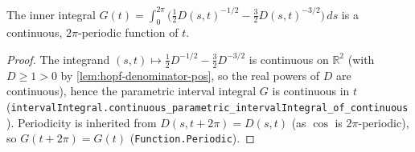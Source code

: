 \begin{lemma}
    \label{lem:hopf-inner-integral-regularity}
    \leanok
    The inner integral
    $G(t)=\int_0^{2\pi}\bigl(\tfrac12 D(s,t)^{-1/2}-\tfrac32 D(s,t)^{-3/2}\bigr)\,ds$
    is a continuous, $2\pi$-periodic function of $t$.
\end{lemma}
\begin{proof}
    The integrand $(s,t)\mapsto\tfrac12 D^{-1/2}-\tfrac32 D^{-3/2}$ is continuous on
    $\mathbb{R}^2$ (with $D\ge1>0$ by \cref{lem:hopf-denominator-pos}, so the real
    powers of $D$ are continuous), hence the parametric interval integral $G$ is
    continuous in $t$ (\texttt{intervalIntegral.continuous\_parametric\_intervalIntegral\_of\_continuous}).
    Periodicity is inherited from $D(s,t+2\pi)=D(s,t)$ (as $\cos$ is $2\pi$-periodic),
    so $G(t+2\pi)=G(t)$ (\texttt{Function.Periodic}).
\end{proof}


